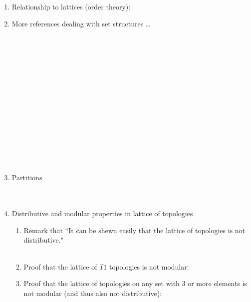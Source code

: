 {\begin{survey}
\begin{enumerate}
\item Relationship to lattices (order theory):
  \\

\item More references dealing with set structures \ldots
  \\
  \\
  \\
  \\
  \\
  \\
  \\
  \\
  \\
  \\
  \\
  \\
  \\
  \\
  \\

\item Partitions
  \\
  \\
  \\

\item Distributive and modular properties in lattice of topologies
  \begin{enumerate}
    \item Remark that ``It can be shewn easily that the lattice of topologies is not distributive."
          \\
          \\

    \item Proof that the lattice of $T1$ topologies is not modular:
          \\

    \item Proof that the lattice of topologies on any set with 3 or more elements
          is not modular (and thus also not distributive):
          \\
  \end{enumerate}


\end{enumerate}
\end{survey}}
